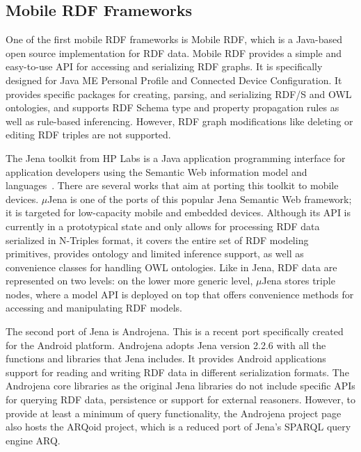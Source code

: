 \subsection{Mobile RDF Frameworks}
One of the first mobile RDF frameworks is Mobile RDF, which is a Java-based open source implementation for RDF data. Mobile RDF provides a simple and easy-to-use API for accessing and serializing RDF graphs. It is specifically designed for Java ME Personal Profile and Connected Device Configuration. It provides specific packages for creating, parsing, and serializing RDF/S and OWL ontologies, and supports RDF Schema type and property propagation rules as well as rule-based inferencing. However, RDF graph modifications like deleting or editing RDF triples are not supported.

The Jena toolkit from HP Labs is a Java application programming interface for application developers using the Semantic Web information model and languages~\cite{mcbride:2002}. There are several works that aim at porting this toolkit to mobile devices. $\mu$Jena is one of the ports of this popular Jena Semantic Web framework; it is targeted for low-capacity mobile and embedded devices. Although its API is currently in a prototypical state and only allows for processing RDF data serialized in N-Triples format, it covers the entire set of RDF modeling primitives, provides ontology and limited inference support, as well as convenience classes for handling OWL ontologies. Like in Jena, RDF data are represented on two levels: on the lower more generic level, $\mu$Jena stores triple nodes, where a model API is deployed on top that offers convenience methods for accessing and manipulating RDF models. 

The second port of Jena is Androjena. This is a recent port specifically created for the Android platform. Androjena adopts Jena version 2.2.6 with all the functions and libraries that Jena includes. It provides Android applications support for reading and writing RDF data in different serialization formats. The Androjena core libraries as the original Jena libraries do not include specific APIs for querying RDF data, persistence or support for external reasoners. However, to provide at least a minimum of query functionality, the Androjena project page also hosts the ARQoid project, which is a reduced port of Jena’s SPARQL query engine ARQ. 

